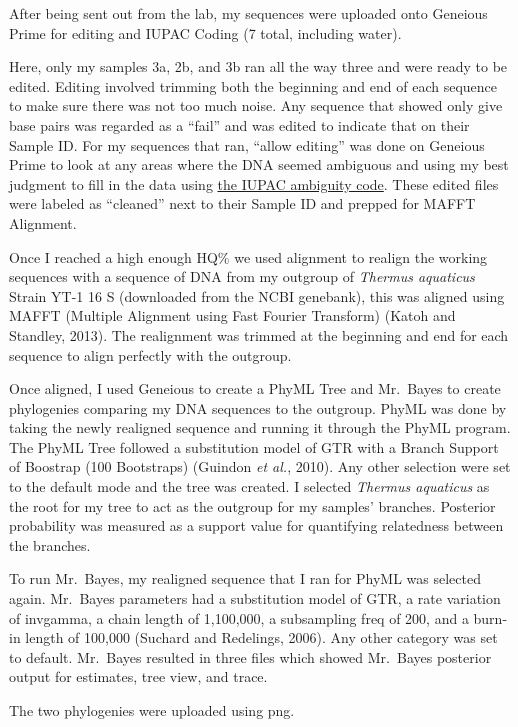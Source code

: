 \documentclass[]{article}
\begin{document}
After being sent out from the lab, my sequences were uploaded onto
Geneious Prime for editing and IUPAC Coding (7 total, including water).

Here, only my samples 3a, 2b, and 3b ran all the way three and were
ready to be edited. Editing involved trimming both the beginning and end
of each sequence to make sure there was not too much noise. Any sequence
that showed only give base pairs was regarded as a ``fail'' and was
edited to indicate that on their Sample ID. For my sequences that ran,
``allow editing'' was done on Geneious Prime to look at any areas where
the DNA seemed ambiguous and using my best judgment to fill in the data
using \href{https://droog.gs.washington.edu/parc/images/iupac.html}{the
IUPAC ambiguity code}. These edited files were labeled as ``cleaned''
next to their Sample ID and prepped for MAFFT Alignment.

Once I reached a high enough HQ\% we used alignment to realign the
working sequences with a sequence of DNA from my outgroup of
\emph{Thermus aquaticus} Strain YT-1 16 S (downloaded from the NCBI
genebank), this was aligned using MAFFT (Multiple Alignment using Fast
Fourier Transform) (Katoh and Standley, 2013). The realignment was
trimmed at the beginning and end for each sequence to align perfectly
with the outgroup.

Once aligned, I used Geneious to create a PhyML Tree and Mr.~Bayes to
create phylogenies comparing my DNA sequences to the outgroup. PhyML was
done by taking the newly realigned sequence and running it through the
PhyML program. The PhyML Tree followed a substitution model of GTR with
a Branch Support of Boostrap (100 Bootstraps) (Guindon \emph{et al.},
2010). Any other selection were set to the default mode and the tree was
created. I selected \emph{Thermus aquaticus} as the root for my tree to
act as the outgroup for my samples' branches. Posterior probability was
measured as a support value for quantifying relatedness between the
branches.

To run Mr.~Bayes, my realigned sequence that I ran for PhyML was
selected again. Mr.~Bayes parameters had a substitution model of GTR, a
rate variation of invgamma, a chain length of 1,100,000, a subsampling
freq of 200, and a burn-in length of 100,000 (Suchard and Redelings,
2006). Any other category was set to default. Mr.~Bayes resulted in
three files which showed Mr.~Bayes posterior output for estimates, tree
view, and trace.

The two phylogenies were uploaded using png.
\end{document}
